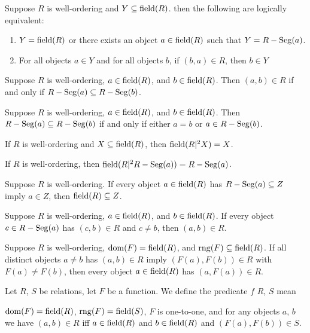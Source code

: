 \documentclass{article}
\begin{document}
\begin{thm}
\item\label{wellord1:28} Suppose $R$ is well-ordering and $Y\subseteq\operatorname{field}(R)$.
  then the following are logically equivalent:
  \begin{enumerate}[label=(\roman*)]
  \item $Y=\operatorname{field}(R)$ or there exists an object $a\in\operatorname{field}(R)$ such
    that $Y=R-\operatorname{Seg}(a)$.
  \item For all objects $a\in Y$ and for all objects $b$, if $(b,a)\in R$,
    then $b\in Y$
  \end{enumerate}
\item\label{wellord1:29} Suppose $R$ is well-ordering, $a\in\operatorname{field}(R)$, and
  $b\in\operatorname{field}(R)$. Then $(a,b)\in R$ if and only if $R-\operatorname{Seg}(a)\subseteq R-\operatorname{Seg}(b)$.
\item\label{wellord1:30} Suppose $R$ is well-ordering, $a\in\operatorname{field}(R)$, and
  $b\in\operatorname{field}(R)$. Then $R-\operatorname{Seg}(a)\subseteq R-\operatorname{Seg}(b)$ if and only if
  either $a=b$ or $a\in R-\operatorname{Seg}(b)$.
\item\label{wellord1:31} If $R$ is well-ordering and
  $X\subseteq\operatorname{field}(R)$, then $\operatorname{field}(R|^{2}X)=X$.
\item\label{wellord1:32} If $R$ is well-ordering, then $\operatorname{field}(R|^{2}R-\operatorname{Seg}(a))=R-\operatorname{Seg}(a)$.
\item\label{wellord1:33} Suppose $R$ is well-ordering. If every object
  $a\in\operatorname{field}(R)$ has $R-\operatorname{Seg}(a)\subseteq Z$ imply $a\in Z$, then
  $\operatorname{field}(R)\subseteq Z$.
\item\label{wellord1:34} Suppose $R$ is well-ordering, $a\in\operatorname{field}(R)$,
  and $b\in\operatorname{field}(R)$. If every object $c\in R-\operatorname{Seg}(a)$ has $(c,b)\in R$
  and $c\neq b$, then $(a,b)\in R$.
\item\label{wellord1:35} Suppose $R$ is well-ordering,
  $\operatorname{dom}(F)=\operatorname{field}(R)$, and $\operatorname{rng}(F)\subseteq\operatorname{field}(R)$.
  If all distinct objects $a\neq b$ has $(a,b)\in R$ imply
  $(F(a),F(b))\in R$ with $F(a)\neq F(b)$,
  then every object $a\in\operatorname{field}(R)$ has $(a,F(a))\in R$.
\end{thm}

\begin{definition}
Let $R$, $S$ be relations, let $F$ be a function.
We define the predicate $f$  $R$, $S$ mean
\begin{defn}
\item $\operatorname{dom}(F)=\operatorname{field}(R)$, $\operatorname{rng}(F)=\operatorname{field}(S)$, $F$ is one-to-one,
  and for any objects $a$, $b$ we have $(a,b)\in R$ iff $a\in\operatorname{field}(R)$
  and $b\in\operatorname{field}(R)$ and $(F(a),F(b))\in S$.
\end{defn}
\end{definition}
\end{document}
